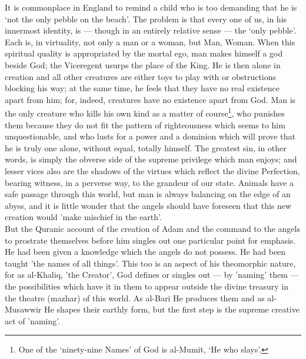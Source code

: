 \documentclass[10pt, twoside]{book}
\begin{document}
It is commonplace in England to remind a child who is too demanding that he is `not the only pebble 
on the beach'. The problem is that every one of us, in his innermost identity, is --- though in an 
entirely relative sense --- the `only pebble'. Each is, in virtuality, not only a man or a woman, but 
Man, Woman. When this spiritual quality is appropriated by the mortal ego, man makes himself a god 
beside God; the Viceregent usurps the place of the King. He is then alone in creation and all other 
creatures are either toys to play with or obstructions blocking his way; at the same time, he feels 
that they have no real existence apart from him; for, indeed, creatures have no existence apart from 
God. Man is the only creature who kills his own kind as a matter of course\footnote{One of the `ninety\hyp{}nine Names' of God is al\hyp{}Mumit, `He who slays'.}, who punishes them 
because they do not fit the pattern of righteousness which seems to him unquestionable, and who lusts 
for a power and a dominion which will prove that he is truly one alone, without equal, totally 
himself. The greatest sin, in other words, is simply the obverse side of the supreme privilege which 
man enjoys; and lesser vices also are the shadows of the virtues which reflect the divine Perfection, 
bearing witness, in a perverse way, to the grandeur of our state. Animals have a safe passage through 
this world, but man is always balancing on the edge of an abyss, and it is little wonder that the 
angels should have foreseen that this new creation would 'make mischief in the earth'. \\

But the Quranic account of the creation of Adam and the command to the angels to prostrate themselves 
before him singles out one particular point for emphasis. He had been given a knowledge which the 
angels do not possess. He had been taught 'the names of all things'. This too is an aspect of his 
theomorphic nature, for as al\hyp{}Khaliq, 'the Creator', God defines or singles out --- by 'naming' them --- 
the possibilities which have it in them to appear outside the divine treasury in the theatre (mazhar) 
of this world. As al\hyp{}Bari He produces them and as al\hyp{}Musawwir He shapes their earthly form, but the 
first step is the supreme creative act of 'naming'. \\
\end{document}
